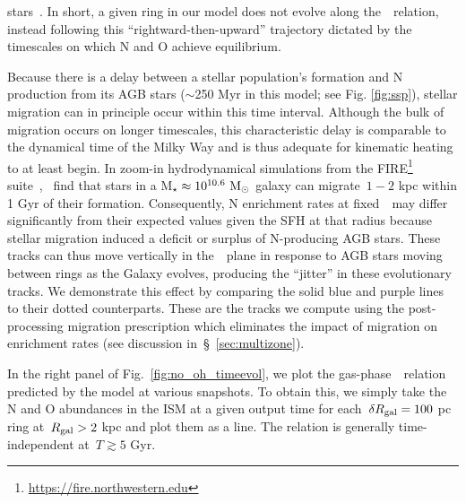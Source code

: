 \documentclass[ms.tex]{subfiles}
\begin{document}
stars~\citep[e.g.][]{Schoenrich2009, Nidever2014, Buck2020, Sharma2021}.
In short, a given ring in our model does not evolve along the~\ohno~relation,
instead following this ``rightward-then-upward'' trajectory dictated by the
timescales on which N and O achieve equilibrium.
\par
Because there is a delay between a stellar population's formation and N
production from its AGB stars ($\sim$250 Myr in this model; see Fig.
\ref{fig:ssp}), stellar migration can in principle occur within this time
interval.
Although the bulk of migration occurs on longer timescales, this characteristic
delay is comparable to the dynamical time of the Milky Way and is thus adequate
for kinematic heating to at least begin.
In zoom-in hydrodynamical simulations from the FIRE\footnote{
	\url{https://fire.northwestern.edu}
} suite~\citep{Hopkins2014},~\citet{El-Badry2016} find that stars in a
M$_\star \approx 10^{10.6}~\text{M}_\odot$ galaxy can migrate~$1 - 2$ kpc within 1 Gyr
of their formation.
Consequently, N enrichment rates at fixed~\rgal~may differ significantly from
their expected values given the SFH at that radius because stellar migration
induced a deficit or surplus of N-producing AGB stars.
These tracks can thus move vertically in the~\ohno~plane in response to AGB
stars moving between rings as the Galaxy evolves, producing the ``jitter'' in
these evolutionary tracks.
We demonstrate this effect by comparing the solid blue and purple lines to
their dotted counterparts.
These are the tracks we compute using the post-processing migration
prescription which eliminates the impact of migration on enrichment rates (see
discussion in~\S~\ref{sec:multizone}).
\par
In the right panel of Fig.~\ref{fig:no_oh_timeevol}, we plot the
gas-phase~\ohno~relation predicted by the model at various snapshots.
To obtain this, we simply take the N and O abundances in the ISM at a given
output time for each~$\delta R_\text{gal} = 100$ pc ring at~$R_\text{gal} > 2$ kpc and plot
them as a line.
The relation is generally time-independent at~$T \gtrsim 5$ Gyr.
\end{document}
